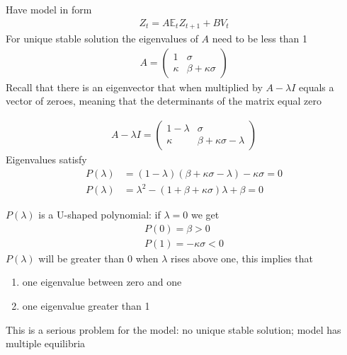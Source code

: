 \documentclass{beamer}
\begin{document}
\begin{frame}
 Have model in form
 \begin{align}
  Z_t=A\mathbb{E}_tZ_{t+1}+BV_t 
 \end{align}
 For unique stable solution the eigenvalues of $A$ need to be less than 1
\begin{align} 
 A=\begin{pmatrix} 1 & \sigma \\ \kappa & \beta +\kappa\sigma \end{pmatrix} 
 \end{align}
 Recall that there is an eigenvector that when multiplied by $A-\lambda I$ equals a vector of zeroes, meaning that the determinants of the matrix equal zero
\end{frame}

\begin{frame}
  \begin{align}
  A-\lambda I = \begin{pmatrix}
    1-\lambda & \sigma \\
    \kappa    & \beta + \kappa \sigma - \lambda
  \end{pmatrix}
 \end{align}
 Eigenvalues satisfy
\begin{align} 
    P(\lambda) &=(1-\lambda)(\beta+\kappa\sigma-\lambda)-\kappa\sigma=0\\
    P(\lambda) &= \lambda^2  -(1+\beta+\kappa\sigma)\lambda+\beta=0
\end{align} 
\end{frame}

\begin{frame} $P(\lambda)$ is a U-shaped polynomial: if $\lambda=0$ we get 
 \begin{align}
   P(0)=\beta>0\\
   P(1)=-\kappa \sigma <0
 \end{align}
 $P(\lambda)$ will be greater than 0 when $\lambda$ rises above one, this implies that 
 \begin{enumerate}
   \item one eigenvalue between zero and one 
   \item one eigenvalue greater than 1
 \end{enumerate}
\medskip
This is a serious problem for the model: no unique stable solution; model has multiple equilibria
\end{frame}
\end{document}
